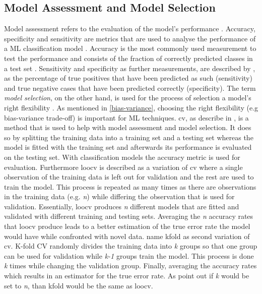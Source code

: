 \subsection{Model Assessment and Model Selection} \label{Model Selection}
Model assessment refers to the evaluation of the model's performance \autocite{introtostat}. Accuracy, specificity and sensitivity are metrics that are used to analyse the performance of a \gls{ML} classification model \autocite{noorApplicationDeepLearning2020}. Accuracy is the most commonly used measurement to test the performance and consists of the fraction of correctly predicted classes in a test set \autocite{pereiraMachineLearningClassifiers2009}. Sensitivity and specificity as further measurements, are described by \textcite{noorApplicationDeepLearning2020}, as the percentage of true positives that have been predicted as such (sensitivity) and true negative cases that have been predicted correctly (specificity).
The term \textit{model selection}, on the other hand, is used for the process of selection a model's right flexibility \autocite{introtostat}. As mentioned in \ref{bias-variance}, choosing the right flexibility (e.g bias-variance trade-off) is important for \gls{ML} techniques.
\gls{cv}, as describe in \textcite{introtostat}, is a method that is used to help with model assessment and model selection. It does so by splitting the training data into a training set and a testing set whereas the model is fitted with the training set and afterwards its performance is evaluated on the testing set. With classification models the accuracy metric is used for evaluation. Furthermore \gls{loocv} is described as a variation of \gls{cv} where a single observation of the training data is left out for validation and the rest are used to train the model. This process is repeated as many times as there are observations in the training data (e.g. \textit{n}) while differing the observation that is used for validation. Essentially, \gls{loocv} produces \textit{n} different models that are fitted and validated with different training and testing sets. Averaging the \textit{n} accuracy rates that \gls{loocv} produce leads to a better estimation of the true error rate the model would have while confronted with novel data. 
\textcite{introtostat} name \gls{kfold} as second variation of \gls{cv}. K-fold CV randomly divides the training data into \textit{k} groups so that one group can be used for validation while \textit{k-1} groups train the model. This process is done \textit{k} times while changing the validation group. Finally, averaging the accuracy rates which results in an estimator for the true error rate. As \textcite{introtostat} point out if \textit{k} would be set to \textit{n}, than \gls{kfold} would be the same as \gls{loocv}.  

\newline












